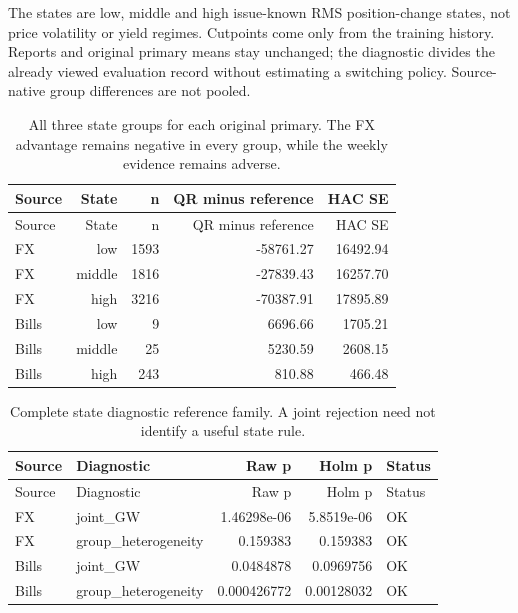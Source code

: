\documentclass[11pt,a4paper]{article}
\begin{document}
The states are low, middle and high issue-known RMS position-change
states, not price volatility or yield regimes. Cutpoints come only from the
training history. Reports and original primary means stay unchanged; the
diagnostic divides the already viewed evaluation record without estimating a
switching policy. Source-native group differences are not pooled.
\begingroup
\small
\setlength{\tabcolsep}{3pt}
\renewcommand{\arraystretch}{1.12}
\begin{longtable}{lrrrr}
\caption{All three state groups for each original primary. The FX advantage remains negative in every group, while the weekly evidence remains adverse.}\\
\toprule
Source & State & n & QR minus reference & HAC SE \\
\midrule
\endfirsthead
\toprule
Source & State & n & QR minus reference & HAC SE \\
\midrule
\endhead
\bottomrule
\endfoot
FX & low & 1593 & -58761.27 & 16492.94 \\
FX & middle & 1816 & -27839.43 & 16257.70 \\
FX & high & 3216 & -70387.91 & 17895.89 \\
Bills & low & 9 & 6696.66 & 1705.21 \\
Bills & middle & 25 & 5230.59 & 2608.15 \\
Bills & high & 243 & 810.88 & 466.48 \\
\end{longtable}
\endgroup

\begingroup
\small
\setlength{\tabcolsep}{3pt}
\renewcommand{\arraystretch}{1.12}
\begin{longtable}{lp{35mm}rrl}
\caption{Complete state diagnostic reference family. A joint rejection need not identify a useful state rule.}\\
\toprule
Source & Diagnostic & Raw p & Holm p & Status \\
\midrule
\endfirsthead
\toprule
Source & Diagnostic & Raw p & Holm p & Status \\
\midrule
\endhead
\bottomrule
\endfoot
FX & joint\_GW & 1.46298e-06 & 5.8519e-06 & OK \\
FX & group\_heterogeneity & 0.159383 & 0.159383 & OK \\
Bills & joint\_GW & 0.0484878 & 0.0969756 & OK \\
Bills & group\_heterogeneity & 0.000426772 & 0.00128032 & OK \\
\end{longtable}
\endgroup
\end{document}
